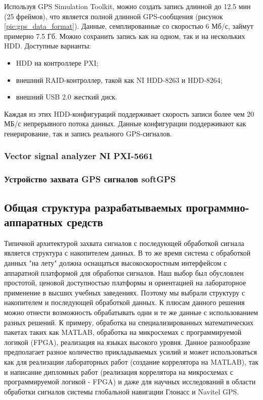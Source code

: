 Используя GPS Simulation Toolkit, можно создать запись длинной до 12.5 мин (25 фреймов), что является полной длинной
GPS-сообщения \cite{yacenkov, tsui} (рисунок \ref{pic:gps_data_format}). Данные, семплированные со скоростью 6 Мб/с,
займут примерно 7.5 Гб. Можно сохранить запись как на одном, так и на нескольких HDD. Доступные варианты:
\begin{itemize}
\item HDD на контроллере PXI;
\item внешний RAID-контроллер, такой как NI HDD-8263 и HDD-8264;
\item внешний USB 2.0 жесткий диск.
\end{itemize}

Каждая из этих HDD-конфигураций поддерживает скорость записи более чем 20 МБ/с непрерывного потока данных.
Данные конфигурации поддерживают как генерирование, так и запись реального GPS-сигналов.

\subsubsection{Vector signal analyzer NI PXI-5661}

\subsubsection{Устройство захвата GPS сигналов softGPS}

\subsection{Общая структура разрабатываемых программно-аппаратных средств}
\label{razdel13}

Типичной архитектурой захвата сигналов с последующей обработкой сигнала является структура с накопителем данных. В то же время
система с обработкой данных "на лету" должна оснащаться высокоскоростным интерфейсом с аппаратной платформой для обработки
сигналов. Наш выбор был обусловлен простотой, ценовой доступностью платформы и ориентацией на лабораторное применение
в высших учебных заведениях. Поэтому мы выбрали структуру с накопителем и последующей обработкой данных. К плюсам данного решения
можно отнести возможность обрабатывать одни и те же данные с использованием разных решений. К примеру, обработка на специализированных
математических пакетах таких как MATLAB, обработка на микросхемах с программируемой логикой (FPGA), реализация на языках высокого уровня.
Данное разнообразие предполагает разное количество прикладываемых усилий и может использоваться как для реализации лабораторных работ
(создание коррелятора на MATLAB), так и написание дипломных работ (реализация коррелятора на микросхемах с программируемой логикой - FPGA) и
даже для научных исследований в области обработки сигналов системы глобальной навигации Глонасс и Navitel GPS.

